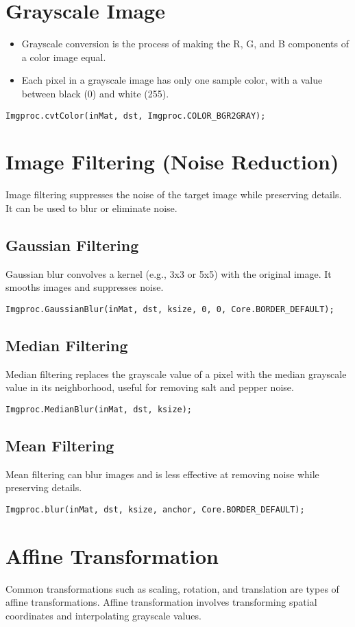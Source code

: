 \documentclass{article}
\begin{document}
	\section{Grayscale Image}
	\begin{itemize}
		\item Grayscale conversion is the process of making the R, G, and B components of a color image equal.
		\item Each pixel in a grayscale image has only one sample color, with a value between black (0) and white (255).
	\end{itemize}
	
	\texttt{Imgproc.cvtColor(inMat, dst, Imgproc.COLOR\_BGR2GRAY);}
	
	\section{Image Filtering (Noise Reduction)}
	Image filtering suppresses the noise of the target image while preserving details. It can be used to blur or eliminate noise.
	\subsection{Gaussian Filtering}
	Gaussian blur convolves a kernel (e.g., 3x3 or 5x5) with the original image. It smooths images and suppresses noise.
	
	\texttt{Imgproc.GaussianBlur(inMat, dst, ksize, 0, 0, Core.BORDER\_DEFAULT);}
	
	\subsection{Median Filtering}
	Median filtering replaces the grayscale value of a pixel with the median grayscale value in its neighborhood, useful for removing salt and pepper noise.
	
	\texttt{Imgproc.MedianBlur(inMat, dst, ksize);}
	
	\subsection{Mean Filtering}
	Mean filtering can blur images and is less effective at removing noise while preserving details.
	
	\texttt{Imgproc.blur(inMat, dst, ksize, anchor, Core.BORDER\_DEFAULT);}
	
	\section{Affine Transformation}
	Common transformations such as scaling, rotation, and translation are types of affine transformations. Affine transformation involves transforming spatial coordinates and interpolating grayscale values.
	
\end{document}
